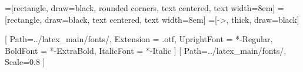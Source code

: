 \usepackage{dsfont}
\usepackage{bm}
\usepackage[english]{babel}
\usepackage[T1]{fontenc}
\usepackage{graphicx}
\graphicspath{ {./figures/} }
\usepackage{algorithm}
\usepackage[ruled,vlined,algo2e,linesnumbered]{algorithm2e}
\usepackage{hyperref}
\usepackage{booktabs}
\usepackage{mathtools}

\usepackage{amsmath,amssymb}
\usepackage{latexsym}

\DeclareMathOperator*{\argmax}{arg\,max}
\DeclareMathOperator*{\argmin}{arg\,min}

\usepackage{pgfplots}
\pgfplotsset{compat=1.16}
\usepackage{tikz}
\usetikzlibrary{trees} 
\usetikzlibrary{shapes.geometric}
\usetikzlibrary{positioning,shapes,shadows,arrows,calc,mindmap}
\usetikzlibrary{positioning,fadings,through}
\usetikzlibrary{decorations.pathreplacing}
\usetikzlibrary{intersections}
=[rectangle, draw=black, rounded corners, text centered, text width=8em]
=[rectangle, draw=black, text centered, text width=8em]
=[->, thick, draw=black]




\usepackage{unicode-math}

\usepackage{fontspec}
\setsansfont{RotisSansSerifStd}[ 
Path=../latex_main/fonts/,
Extension = .otf,
UprightFont = *-Regular,  %
BoldFont = *-ExtraBold,  %
ItalicFont = *-Italic
]
\setmonofont{Cascadia}[
	Path=../latex_main/fonts/,
	Scale=0.8
]



\newcommand{\lit}[2]{\href{#2}{\footnotesize\color{black!60}[#1]}}

\newcommand{\vect}[1]{\mathbf{#1}}

